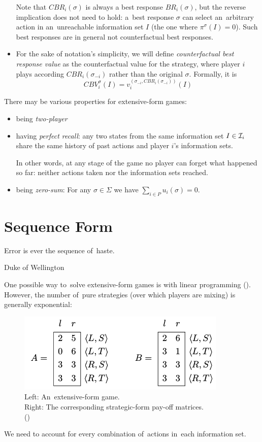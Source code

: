 \begin{itemize}
    Note that $CBR _i (\sigma)$ is always a best response $BR _i (\sigma)$, but the reverse implication does not need to hold:
    a~best response $\sigma$ can select an~arbitrary action in an~unreachable information set $I$ (the one where $\pi ^\sigma (I) = 0$).
    Such best responses are in general not counterfactual best responses.

  \item For the sake of notation's simplicity, we will define \emph{counterfactual best response value} as the counterfactual value for the strategy, where player $i$ plays according $CBR _i (\sigma _{-i})$ rather than the original $\sigma$.
    Formally, it is
    \[ CBV _i ^\sigma (I) = v _i ^{(\sigma _{-i}, CBR _i (\sigma _{-i} ))} (I) \]

\end{itemize}

There may be various properties for extensive-form games:

\begin{itemize}
  \item being \emph{two-player}
  \item having \emph{perfect recall}: any two states from the same information set $I \in \mathcal{I} _i$ share the same history of past actions and player $i$'s information sets.

    In other words, at any stage of the game no player can forget what happened so far:
    neither actions taken nor the information sets reached.
  \item being \emph{zero-sum}: For any $\sigma \in \Sigma$ we have $\sum _{i \in P} u _i (\sigma) = 0$.
\end{itemize}

\section{Sequence Form}
{
  \setlength{\epigraphwidth}{0.65\textwidth}
  \epigraph{
    Error is ever the sequence of~haste.
  }{Duke of Wellington}
}%
One possible way to~solve extensive-form games is with linear programming (\cite[pp.~73--74]{AGT07}).
However, the number of~pure strategies (over which players are mixing) is generally exponential:
\begin{figure}[H]
  \centering
  \tiny
  \def\svgwidth{.5\textwidth}
  
  \includegraphics[width=.4\textwidth]{../img/strategic-form.png}
  \def\captionTitle{Left: An~extensive-form game. \\Right: The corresponding strategic-form pay-off matrices.}
  \caption[\captionTitle]{\captionTitle{} \\(\cite[p.~67]{AGT07})}
  \label{fig:strategic-form}
\end{figure}
We need to account for every combination of~actions in~each information set.

